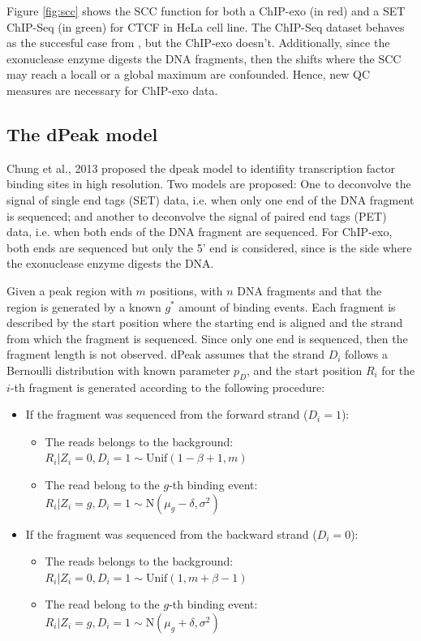 \documentclass[11pt]{article}\usepackage[]{graphicx}\usepackage[]{color}
\begin{document}
Figure \ref{fig:scc} shows the SCC function for both a ChIP-exo (in
red) and a SET ChIP-Seq (in green) for CTCF in HeLa cell line. The
ChIP-Seq dataset behaves as the succesful case from \cite{encode_qc},
but the ChIP-exo doesn't. Additionally, since the exonuclease enzyme
digests the DNA fragments, then the shifts where the SCC may reach a
locall or a global maximum are confounded. Hence, new QC measures are
necessary for ChIP-exo data.

\subsection{The dPeak model}
\label{sec:dpeak}

Chung et al., 2013 proposed the dpeak model to identifity
transcription factor binding sites in high resolution. Two models are
proposed: One to deconvolve the signal of single end tags (SET) data,
i.e. when only one end of the DNA fragment is sequenced; and another
to deconvolve the signal of paired end tags (PET) data, i.e. when both
ends of the DNA fragment are sequenced. For ChIP-exo, both ends are
sequenced but only the 5' end is considered, since is the side where
the exonuclease enzyme digests the DNA.

Given a peak region with $m$ positions, with $n$ DNA fragments and that
the region is generated by a known $g^*$ amount of binding
events. Each fragment is described by the start position where the
starting end is aligned and the strand from which the fragment is
sequenced. Since only one end is sequenced, then the fragment length
is not observed. dPeak assumes that the strand $D_i$ follows a
Bernoulli distribution with known parameter $p_D$, and the start
position $R_i$ for the $i$-th fragment is generated according to the
following procedure:

\begin{itemize}
\item If the fragment was sequenced from the forward strand ($D_i =
  1$):
  \begin{itemize}
  \item The reads belongs to the background: $R_i | Z_i = 0, D_i = 1
    \sim \mbox{Unif}(1 - \beta + 1, m)$
  \item The read belong to the $g$-th binding event: $R_i | Z_i = g,
    D_i = 1 \sim \mbox{N}(\mu_g - \delta , \sigma^2)$
  \end{itemize}
\item If the fragment was sequenced from the backward strand ($D_i =
  0$):
  \begin{itemize}
  \item The reads belongs to the background: $R_i | Z_i = 0, D_i = 1
    \sim \mbox{Unif}(1 , m + \beta  - 1)$
  \item The read belong to the $g$-th binding event: $R_i | Z_i = g,
    D_i = 1 \sim \mbox{N}(\mu_g + \delta , \sigma^2)$
  \end{itemize}
  
\end{itemize}
\end{document}
